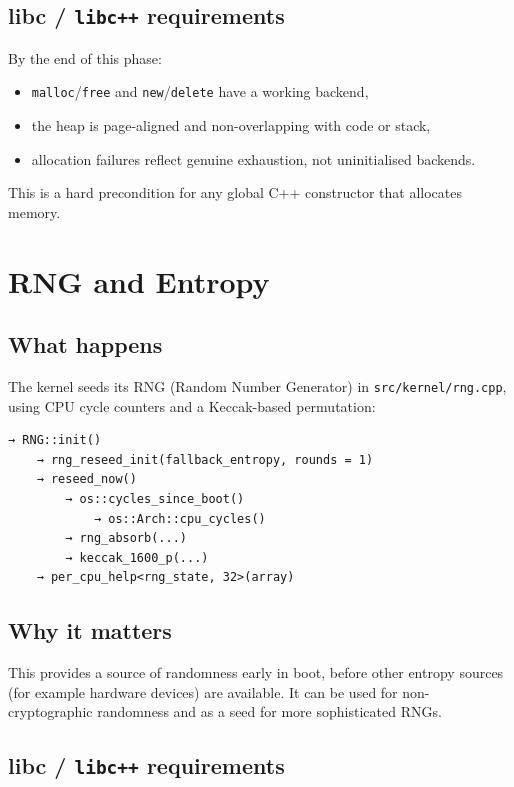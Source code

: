 \documentclass[a4paper,11pt]{article}
\begin{document}
\subsection{libc / \texorpdfstring{\texttt{libc++}}{libc++} requirements}

By the end of this phase:

\begin{itemize}
  \item \texttt{malloc}/\texttt{free} and \texttt{new}/\texttt{delete} have a working
        backend,
  \item the heap is page-aligned and non-overlapping with code or
        stack,
  \item allocation failures reflect genuine exhaustion, not uninitialised
        backends.
\end{itemize}

This is a hard precondition for any global C++ constructor that
allocates memory.

\section{RNG and Entropy}

\subsection{What happens}

The kernel seeds its RNG (Random Number Generator) in
\texttt{src/kernel/rng.cpp}, using CPU cycle counters and a
Keccak-based permutation:

\begin{verbatim}
→ RNG::init()
    → rng_reseed_init(fallback_entropy, rounds = 1)
    → reseed_now()
        → os::cycles_since_boot()
            → os::Arch::cpu_cycles()
        → rng_absorb(...)
        → keccak_1600_p(...)
    → per_cpu_help<rng_state, 32>(array)
\end{verbatim}

\subsection{Why it matters}

This provides a source of randomness early in boot, before other entropy
sources (for example hardware devices) are available. It can be used
for non-cryptographic randomness and as a seed for more sophisticated
RNGs.

\subsection{libc / \texorpdfstring{\texttt{libc++}}{libc++} requirements}
\end{document}
